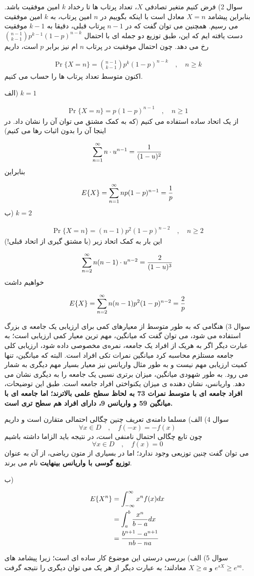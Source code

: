 \documentclass[10pt,letterpaper]{report}
\newcommand{\eqn}[1]{
\[\begin{split}
#1
\end{split}\]
}
\begin{document}
سوال 2) فرض کنیم متغیر تصادفی $X$، تعداد پرتاب ها تا رخداد $k$ امین موفقیت  باشد. بنابراین پیشامد $X=n$ معادل است با اینکه بگوییم در $n$ امین پرتاب، به $k$ امین موفقیت می رسیم. همچنین می توان گفت که در $n-1$ پرتاب قبلی، دقیقا به $k-1$ موفقیت دست یافته ایم که این، طبق توزیع دو جمله ای با احتمال 
$
\binom{n-1}{k-1}p^{k-1}(1-p)^{n-k}
$
 رخ می دهد. چون احتمال موفقیت در پرتاب $n$ ام نیز برابر $p$ است، داریم
\eqn{
\Pr\{X=n\}=\binom{n-1}{k-1}p^{k}(1-p)^{n-k}\quad,\quad n\ge k
}{}
اکنون متوسط تعداد پرتاب ها را حساب می کنیم.

الف) $k=1$
\eqn{
\Pr\{X=n\}=p(1-p)^{n-1}\quad,\quad n\ge 1
}{}
از یک اتحاد ساده استفاده می کنیم (که به کمک مشتق می توان آن را نشان داد. در اینجا آن را بدون اثبات رها می کنیم)
\eqn{
\sum_{n=1}^\infty n\cdot u^{n-1}={1\over (1-u)^2}
}{}
بنابراین
\eqn{
E\{X\}=\sum_{n=1}^\infty np(1-p)^{n-1}={1\over p}
}{}
ب) $k=2$
\eqn{
\Pr\{X=n\}=(n-1)p^2(1-p)^{n-2}\quad,\quad n\ge 2
}{}
این بار به کمک اتحاد زیر (با مشتق گیری از اتحاد قبلی!)
\eqn{
\sum_{n=2}^\infty n(n-1)\cdot u^{n-2}={2\over (1-u)^3}
}{}
خواهیم داشت
\eqn{
E\{X\}=\sum_{n=2}^\infty n(n-1)p^2(1-p)^{n-2}={2\over p}
}{}

سوال 3) هنگامی که به طور متوسط از معیارهای کمی برای ارزیابی یک جامعه ی بزرگ استفاده می شود، می توان گفت که میانگین، مهم ترین معیار کمی ارزیابی است؛ به عبارت دیگر اگر به هریک از افراد یک جامعه، نمره‌ی مخصوصی داده شود، ارزیابی کلی جامعه مستلزم محاسبه کرد میانگین نمرات تکی افراد است. البته که میانگین، تنها کمیت ارزیابی مهم نیست و به طور مثال واریانس نیز معیار بسیار مهم دیگری به شمار می رود. به طور شهودی میانگین، میزان برتری نسبی یک جامعه را به دیگری نشان می دهد. واریانس، نشان دهنده ی میزان یکنواختی افراد جامعه است. طبق این توضیحات، 
\textbf{
افراد جامعه ای با متوسط نمرات 73 به لحاظ سطح علمی بالاترند؛ اما جامعه ای با میانگین 59 و واریانس 9، دارای افراد هم سطح تری است.
}

سوال 4) الف) مسلما دامنه‌ی تعریف چنین چگالی احتمالی متقارن است و داریم
$$
\forall x\in D\quad,\quad f(-x)=-f(x)
$$
چون تابع چگالی احتمال نامنفی است، در نتیجه باید الزاما داشته باشیم
$$
\forall x\in D\quad,\quad f(x)=0
$$
می توان گفت چنین توزیعی وجود ندارد؛ اما در بسیاری از متون ریاضی، از آن به عنوان 
\textbf{
توزیع گوسی با واریانس بینهایت
}
 نام می برند.

ب)
\eqn{
E\{X^n\}&=\int_{-\infty}^\infty {x^n}f(x)dx
\\&=\int_{a}^b {x^n\over b-a}dx
\\&={b^{n+1}-a^{n+1}\over nb-na}
}{}

سوال 5)
 الف) بررسی درستی این موضوع کار ساده ای است؛ زیرا پیشامد های 
$
e^{sX}\ge e^{sa}
$
 و 
$
X\ge a
$
 معادلند؛ به عبارت دیگر از هر یک می توان دیگری را نتیجه گرفت.
\end{document}
